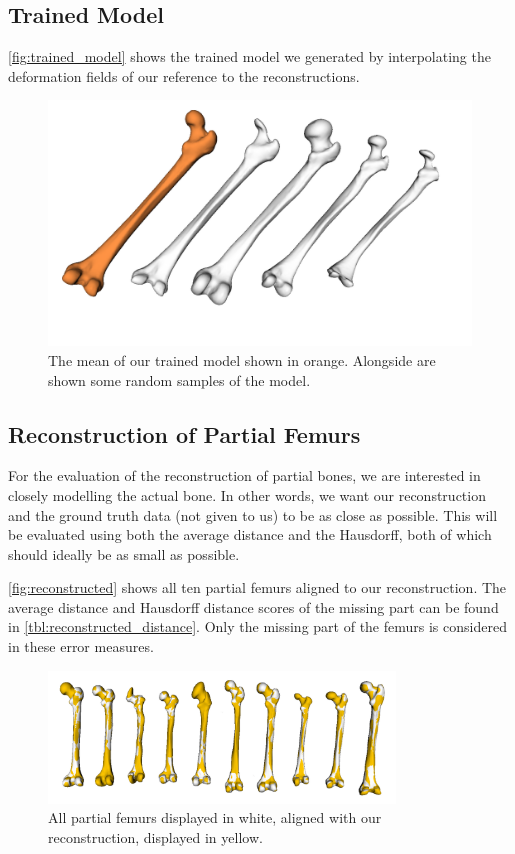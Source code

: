 \subsection{Trained Model}
\label{subsec:trainedmodel}
\autoref{fig:trained_model} shows the trained model we generated by interpolating the deformation fields of our reference to the reconstructions.

\begin{figure}
	\centering
  \includegraphics[width=\columnwidth]{./Figures/interpolated_model_samples}
  \caption{
    The mean of our trained model shown in orange.
    Alongside are shown some random samples of the model.}
  \label{fig:trained_model}
\end{figure}


\subsection{Reconstruction of Partial Femurs}
\label{subsec:reconresults}
For the evaluation of the reconstruction of partial bones, we are interested in closely modelling the actual bone.
In other words, we want our reconstruction and the ground truth data (not given to us) to be as close as possible. 
This will be evaluated using both the average distance and the Hausdorff, both of which should ideally be as small as possible.

\autoref{fig:reconstructed} shows all ten partial femurs aligned to our reconstruction.
The average distance and Hausdorff distance scores of the missing part can be found in \autoref{tbl:reconstructed_distance}.
Only the missing part of the femurs is considered in these error measures.

\begin{figure}
	\centering
  \includegraphics[width=0.82\textwidth]{./Figures/reconstruction_summary}
  \caption{All partial femurs displayed in white, aligned with our reconstruction, displayed in yellow.}
  \label{fig:reconstructed}
\end{figure}

